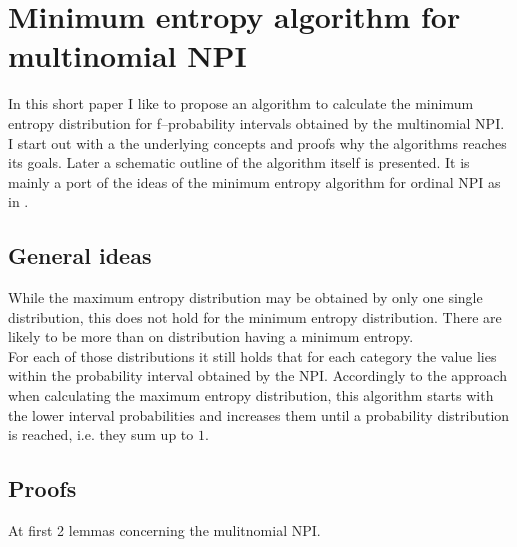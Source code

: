 \documentclass[a4paper]{article}
\theoremstyle{definition} \newtheorem{lemma}{Lemma}
\theoremstyle{remark} \newtheorem{remark}{Remark}
\begin{document}
\section*{Minimum entropy algorithm for multinomial NPI}
In this short paper I like to propose an algorithm to calculate the minimum entropy distribution for f--probability intervals obtained by the multinomial NPI.\\

I start out with a the underlying concepts and proofs why the algorithms reaches its goals. Later a schematic outline of the algorithm itself is presented.
It is mainly a port of the ideas of the minimum entropy algorithm for ordinal NPI as in \cite{minEntAlg}.

\subsection*{General ideas}

While the maximum entropy distribution may be obtained by only one single distribution, this does not hold for the minimum entropy distribution. There are likely to be more than on distribution having a minimum entropy.\\

For each of those distributions it still holds that for each category the value lies within the probability interval obtained by the NPI. Accordingly to the approach when calculating the maximum entropy distribution, this algorithm starts with the lower interval probabilities and increases them until a probability distribution is reached, i.e. they sum up to $1$.

\subsection*{Proofs}

At first 2 lemmas concerning the mulitnomial NPI.
\end{document}
